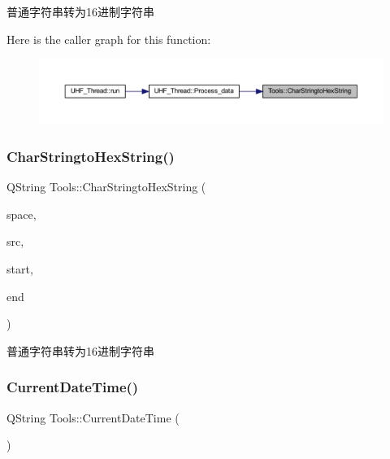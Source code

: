 普通字符串转为16进制字符串 

Here is the caller graph for this function\+:
\nopagebreak
\begin{figure}[H]
\begin{center}
\leavevmode
\includegraphics[width=350pt]{class_tools_a89da3511a27330d893d495ddc6160a91_icgraph}
\end{center}
\end{figure}
\mbox{\label{class_tools_ae4c5caed900acc0c2ca436929a753dff}} 
\subsubsection{\texorpdfstring{CharStringtoHexString()}{CharStringtoHexString()}\hspace{0.1cm}{\footnotesize\ttfamily [2/2]}}
{\footnotesize\ttfamily Q\+String Tools\+::\+Char\+Stringto\+Hex\+String (\begin{DoxyParamCaption}\item[{Q\+String}]{space,  }\item[{const char $\ast$}]{src,  }\item[{int}]{start,  }\item[{int}]{end }\end{DoxyParamCaption})}



普通字符串转为16进制字符串 

\mbox{\label{class_tools_a438ea9326a6ae735d51bc3508c430a3b}} 
\subsubsection{\texorpdfstring{CurrentDateTime()}{CurrentDateTime()}}
{\footnotesize\ttfamily Q\+String Tools\+::\+Current\+Date\+Time (\begin{DoxyParamCaption}{ }\end{DoxyParamCaption})}



